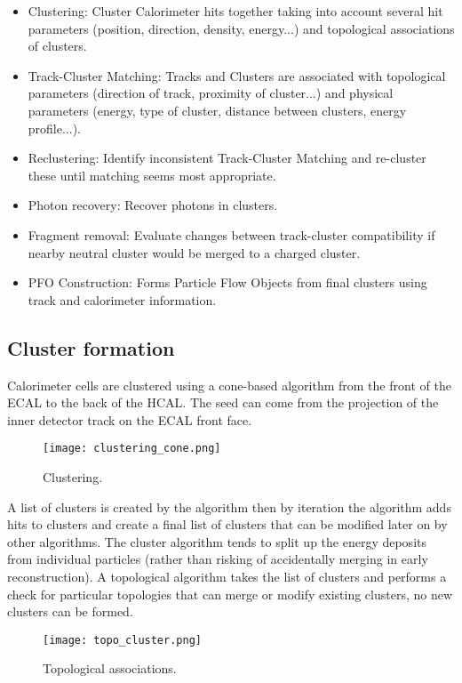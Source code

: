 \documentclass[a4paper,12pt]{article}
\begin{document}
\noindent
\begin{itemize}
\item Clustering: Cluster Calorimeter hits together taking into account several hit parameters (position, direction, density, energy...) and topological associations of clusters.
\item Track-Cluster Matching: Tracks and Clusters are associated with topological parameters (direction of track, proximity of cluster...) and physical parameters (energy, type of cluster, distance between clusters, energy profile...).
\item Reclustering: Identify inconsistent Track-Cluster Matching and re-cluster these until matching seems most appropriate.
\item Photon recovery: Recover photons in clusters.
\item Fragment removal: Evaluate changes between track-cluster compatibility if nearby neutral cluster would be merged to a charged cluster.
\item PFO Construction: Forms Particle Flow Objects from final clusters using track and calorimeter information.
\end{itemize}

\subsection{Cluster formation}

Calorimeter cells are clustered using a cone-based algorithm from the front of the ECAL to the back of the HCAL. The seed can come from the projection of the inner detector track on the ECAL front face. 

\begin{figure}[!h]
   \centering
   \texttt{[image: clustering\_cone.png]} 
      \caption{Clustering.}
   \label{fig:clustering}
\end{figure}

A list of clusters is created by the algorithm then by iteration the algorithm adds hits to clusters and create a final list of clusters that can be modified later on by other algorithms. The cluster algorithm tends to split up the energy deposits from individual particles (rather than risking of accidentally merging in early reconstruction).
A topological algorithm takes the list of clusters and performs a check for particular topologies that can merge or modify existing clusters, no new clusters can be formed. 

\begin{figure}[!h]
   \centering
   \texttt{[image: topo\_cluster.png]} 
      \caption{Topological associations.}
   \label{fig:topo}
\end{figure}
\end{document}
